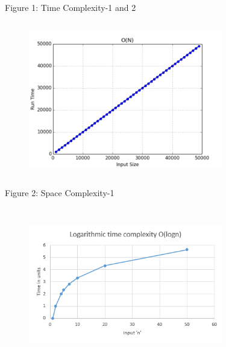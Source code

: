 \documentclass[12pt,a4paper]{article}
\begin{document}
\begin{multicols}{2}
\begin{center}Figure 1: Time Complexity-1 and 2 \end{center}


\end{multicols}
\begin{figure}[h]
\centering
\includegraphics[width=8.44cm,height=6.73cm]{o-n.png}
\end{figure}

\begin{multicols}{2}
\begin{center}Figure 2: Space Complexity-1\end{center}


\end{multicols}
\begin{figure}[h]
\centering
\includegraphics[width=8.44cm,height=6.73cm]{logarithmic-time-complexity.png}
\end{figure}
\end{document}

